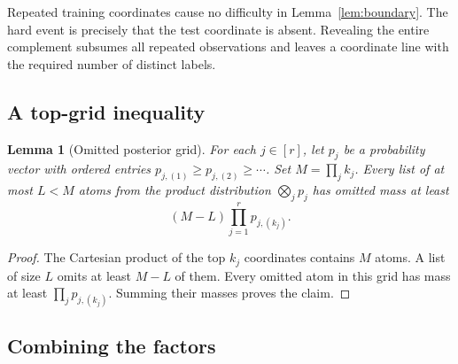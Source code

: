 \documentclass{article}
\newtheorem{lemma}[theorem]{Lemma}
\theoremstyle{definition}
\theoremstyle{remark}
\newcommand{\1}{\mathbf 1}
\begin{document}
Repeated training coordinates cause no difficulty in Lemma~\ref{lem:boundary}. The hard event is precisely that the test coordinate is absent. Revealing the entire complement subsumes all repeated observations and leaves a coordinate line with the required number of distinct labels.

\subsection{A top-grid inequality}

\begin{lemma}[Omitted posterior grid]
\label{lem:grid}
For each \(j\in[r]\), let \(p_j\) be a probability vector with ordered entries \(p_{j,(1)}\ge p_{j,(2)}\ge\cdots\). Set \(M=\prod_jk_j\). Every list of at most \(L<M\) atoms from the product distribution \(\bigotimes_jp_j\) has omitted mass at least \[ (M-L)\prod_{j=1}^r p_{j,(k_j)}. \]
\end{lemma}

\begin{proof}
The Cartesian product of the top \(k_j\) coordinates contains \(M\) atoms. A list of size \(L\) omits at least \(M-L\) of them. Every omitted atom in this grid has mass at least \(\prod_jp_{j,(k_j)}\). Summing their masses proves the claim.
\end{proof}

\subsection{Combining the factors}
\end{document}
